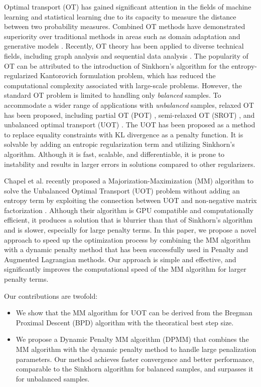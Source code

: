 \documentclass[conference]{IEEEtran}
\begin{document}
Optimal transport (OT) has gained significant attention in the fields of machine learning and statistical learning due to its capacity to measure the distance between two probability measures. Combined OT methods have demonstrated superiority over traditional methods in areas such as domain adaptation \cite{Courty_PAMI_2017} and generative models \cite{arjovsky2017wasserstein}. Recently, OT theory has been applied to diverse technical fields, including graph analysis \cite{Huang_SigPro_2020,Huang_ICASSP_2021,Fang_AAAI_2023} and sequential data analysis \cite{Horie_EUSIPCO_2022}. The popularity of OT can be attributed to the introduction of Sinkhorn's algorithm \cite{Cuturi_NIPS_2013} for the entropy-regularized Kantorovich formulation problem, which has reduced the computational complexity associated with large-scale problems. However, the standard OT problem is limited to handling only {\it balanced} samples. To accommodate a wider range of applications with {\it unbalanced} samples, relaxed OT has been proposed, including partial OT (POT) \cite{ferradans2013regularized}, semi-relaxed OT (SROT) \cite{fukunaga_icassp2022,fukunaga_srsinkhorn}, and unbalanced optimal transport (UOT) \cite{Caffarelli_AM_2010,chizat2017scaling}. The UOT has been proposed as a method to replace equality constraints with KL divergence as a penalty function. It is solvable by adding an entropic regularization term and utilizing Sinkhorn's algorithm. Although it is fast, scalable, and differentiable, it is prone to instability and results in larger errors in solutions compared to other regularizers.

Chapel et al. recently proposed a Majorization-Maximization (MM) algorithm to solve the Unbalanced Optimal Transport (UOT) problem without adding an entropy term by exploiting the connection between UOT and non-negative matrix factorization \cite{Chapel_NeurIPS_2021}. Although their algorithm is GPU compatible and computationally efficient, it produces a solution that is blurrier than that of Sinkhorn's algorithm and is slower, especially for large penalty terms. In this paper, we propose a novel approach to speed up the optimization process by combining the MM algorithm with a dynamic penalty method that has been successfully used in Penalty and Augmented Lagrangian methods. Our approach is simple and effective, and significantly improves the computational speed of the MM algorithm for larger penalty terms.

Our contributions are twofold:
\begin{itemize}
\item We show that the MM algorithm for UOT can be derived from the Bregman Proximal Descent (BPD) algorithm with the theoratical best step size.
\item We propose a Dynamic Penalty MM algorithm (DPMM) that combines the MM algorithm with the dynamic penalty method to handle large penalization parameters. Our method achieves faster convergence and better performance, comparable to the Sinkhorn algorithm for balanced samples, and surpasses it for unbalanced samples.
\end{itemize}
\end{document}
